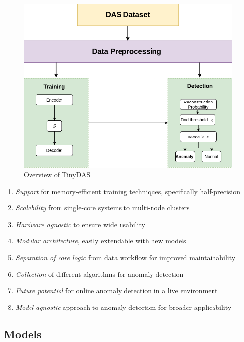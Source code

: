 \begin{figure}[!h]
    \centering
    \includegraphics[scale=0.5]{figures/methodflow.png}
    \caption{Overview of TinyDAS}
    \label{fig:dataflow}
\end{figure}


\begin{enumerate}
    \item \textit{Support} for memory-efficient training techniques, specifically half-precision
    \item \textit{Scalability} from single-core systems to multi-node clusters
    \item \textit{Hardware agnostic} to ensure wide usability
    \item \textit{Modular architecture}, easily extendable with new models
    \item \textit{Separation of core logic} from data workflow for improved maintainability
    \item \textit{Collection} of different algorithms for anomaly detection
    \item \textit{Future potential} for online anomaly detection in a live environment
    \item \textit{Model-agnostic} approach to anomaly detection for broader applicability
\end{enumerate}

\subsection{Models} 


